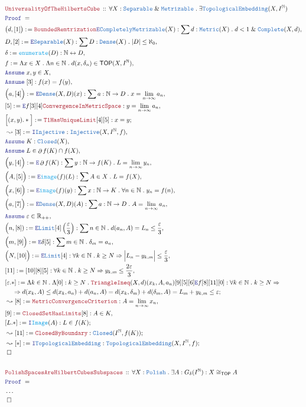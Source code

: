 \documentclass[12pt]{scrartcl}
\newcommand{\TYPE}[1]{\textcolor{NavyBlue}{\mathtt{#1}}}
\newcommand{\FUNC}[1]{\textcolor{Cerulean}{\mathtt{#1}}}
\newcommand{\LOGIC}[1]{\textcolor{Blue}{\mathtt{#1}}}
\newcommand{\THM}[1]{\textcolor{Maroon}{\mathtt{#1}}}
\renewcommand{\.}{\; . \;}
\newcommand{\de}{: \kern 0.1pc =}
\newcommand{\Theorem}[2]{& \THM{#1} \, :: \, #2 \\ & \Proof = \\ }
\newcommand{\NewLine}{\\ & \kern 1pc}
\newcommand{\Page}[1]{ \begin{align*} #1 \end{align*}   }
\newcommand{\NoProof}{ & \ldots \\ \EndProof}
\renewcommand{\And}{\; \& \;}
\newcommand{\Imply}{\Rightarrow}
\newcommand{\Intro}{\LOGIC{I}}
\newcommand{\Elim}{\LOGIC{E}}
\newcommand{\Reals}{\mathbb{R} }
\newcommand{\Nat}{\mathbb{N} }
\newcommand{\ToBij}{\leftrightarrow}
\newcommand{\Say}[3]{& #1 \de #2 : #3, \\}
\newcommand{\SayIn}[3]{& #1 \de #2 \in #3, \\}
\newcommand{\Conclude}[3]{& #1 \de #2 : #3; \\}
\newcommand{\Derive}[3]{& \leadsto #1 \de #2 : #3, \\}
\newcommand{\DeriveConclude}[3]{& \leadsto #1 \de #2 : #3 ; \\}
\newcommand{\Assume}[2]{& \LOGIC{Assume} \; #1 : #2, \\}
\newcommand{\AssumeIn}[2]{& \LOGIC{Assume} \; #1 \in #2, \\}
\newcommand{\QED}{\; \square}
\newcommand{\EndProof}{& \QED \\}
\newcommand{\Proof}{\LOGIC{Proof} \; }
\DeclareMathOperator*{\boundary}{\partial}
\newcommand{\TOP}{\mathsf{TOP}}
\newcommand{\Polish}{\TYPE{Polish}}
\begin{document}
\Page{
	\Theorem{UniversalityOfTheHilbertsCube}
	{
		\forall X : \TYPE{Separable} \And \TYPE{Metrizable} \.
		\exists  \TYPE{TopologicalEmbedding}(X,I^\Nat) 
	}
	\Say{\big(d,[1]\big)}
	{
		\THM{BoundedRemtrization}\Elim \TYPE{CompletelyMetrizable}(X)
	}
	{
		\sum d : \TYPE{Metric}(X) \.
		d < 1 \And  \TYPE{Complete}(X,d)
	}
	\Say{D,[2]}{\Elim \TYPE{Separable}(X)}
	{
		\sum D : \TYPE{Dense}(X) \.
		|D| \le \aleph_0
	}
	\Say{\delta}{\FUNC{enumerate}(D)}{\Nat \ToBij D}
	\SayIn{f}{\Lambda x \in X \. \Lambda n \in \Nat \. d(x,\delta_n)}{\TOP(X,I^\Nat)}
	\AssumeIn{x,y}{X}
	\Assume{[3]}{f(x) = f(y)}
	\Say{\Big(a,[4]\Big)}{\Elim \TYPE{Dense}(X,D)(x)}
	{
		\sum a : \Nat \to D \. x = \lim_{n \to \infty} a_n
	}
	\Say{[5]}{\Elim f [3][4]\THM{ConvergenceInMetricSpace}}{y = \lim_{n \to \infty} a_n }
	\Conclude{\Big[(x,y).*\Big]}{\THM{T1HasUniqueLimit}[4][5]}{x = y}
	\Derive{[3]}{\Intro \TYPE{Injective}}{\TYPE{Injective}(X,I^\Nat,f)}
	\Assume{K}{\TYPE{Closed}(X)}
	\AssumeIn{L}{\boundary f(K) \cap f(X)}
	\Say{\Big(y,[4]\Big)}{\Elim \boundary f(K)}
	{
		\sum y : \Nat \to f(K) \. L = \lim_{n \to \infty} y_n
	}
	\Say{\Big(A ,[5]\Big)}{\Elim \FUNC{image}(f)(L)}
	{
		\sum A \in X \. L = f(X)
	}
	\Say{\Big( x,[6]\Big)}{\Elim \FUNC{image}(f)(y)}
	{
		\sum x : \Nat \to K \. 
		\forall n \in \Nat \. 
		y_n = f(n)
	}
	\Say{\Big(a,[7]\Big)}{\Elim \TYPE{Dense}(X,D)(A)}
	{
		\sum a : \Nat \to D \. A = \lim_{n \to \infty} a_n
	}
	\AssumeIn{\varepsilon}{\Reals_{++}}
	\Say{\Big(n,[8])}{\Elim \TYPE{Limit}[4]\left( \frac{\varepsilon}{3}\right)}
	{
		\sum n \in \Nat \.
		d(a_n,A) = L_n  \le \frac{\varepsilon}{3}
	}
	\Say{\Big(m,[9]\Big)}{\Elim \delta [5]}
	{
		\sum m \in \Nat \. \delta_m = a_n 
	}
	\Say{\Big(N,[10]\Big)}
	{
		\Elim \TYPE{Limit} [4]
	}
	{
		\forall k \in \Nat \. k \ge N \Imply \Big| L_n - y_{k,m} \Big| \le \frac{\varepsilon}{3}
	}
	\Say{[11]}{[10][8][5]}{ \forall k \in \Nat \. k \ge N \Imply y_{k,m} \le \frac{2\varepsilon}{3}}
	\Conclude{[\varepsilon.*]}{
		\Lambda k \in \Nat \. 
		\Lambda [0] : k \ge N \. 
		\THM{TriangleIneq}(X,d)(x_k,A,a_n)
		[9][5][6]
		\Elim f
		[8][11][0]
	}
	{
		\forall k \in \Nat \. k \ge N \Imply
		\NewLine \Imply
		d(x_k,A) \le d(x_k,a_n) + d(a_n,A) = 
		d(x_k,\delta_m) + d(\delta_m,A) =
		L_m  + y_{k,m} \le \varepsilon
	}
	\Derive{[8]}{\THM{MetricConvergenceCriterion}}{ A = \lim_{n \to \infty} x_n  }
	\Say{[9]}{\THM{ClosedSetHasLimits}[8]}{A \in K}
	\Conclude{[L.*]}{\Intro \FUNC{Image}(A)}{L \in f(K)}
	\DeriveConclude{[11]}{\THM{ClosedByBoundary}}{\TYPE{Closed}(I^\Nat,f(K))}
	\DeriveConclude{[*]}{\Intro \TYPE{TopologicalEmbedding}}
	{
		\TYPE{TopologicalEmbedding}(X,I^\Nat,f)
	}
	\EndProof
	\\
	\Theorem{PolishSpacesAreHilbertCubesSubspaces}
	{
		\forall X : \Polish \.
		\exists A : G_\delta(I^\Nat) :
		X \cong_\TOP A
	}
	\NoProof
}
\end{document}
